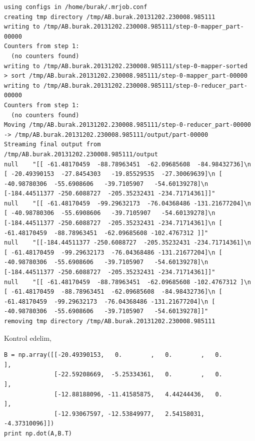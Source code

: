 \documentclass[12pt,fleqn]{article}\usepackage{../../common}
\begin{document}
\begin{verbatim}
using configs in /home/burak/.mrjob.conf
creating tmp directory /tmp/AB.burak.20131202.230008.985111
writing to /tmp/AB.burak.20131202.230008.985111/step-0-mapper_part-00000
Counters from step 1:
  (no counters found)
writing to /tmp/AB.burak.20131202.230008.985111/step-0-mapper-sorted
> sort /tmp/AB.burak.20131202.230008.985111/step-0-mapper_part-00000
writing to /tmp/AB.burak.20131202.230008.985111/step-0-reducer_part-00000
Counters from step 1:
  (no counters found)
Moving /tmp/AB.burak.20131202.230008.985111/step-0-reducer_part-00000 -> /tmp/AB.burak.20131202.230008.985111/output/part-00000
Streaming final output from /tmp/AB.burak.20131202.230008.985111/output
null	"[[ -61.48170459  -88.78963451  -62.09685608  -84.98432736]\n [ -20.49390153  -27.8454303   -19.85529535  -27.30069639]\n [ -40.98780306  -55.6908606   -39.7105907   -54.60139278]\n [-184.44511377 -250.6088727  -205.35232431 -234.71714361]]"
null	"[[ -61.48170459  -99.29632173  -76.04368486 -131.21677204]\n [ -40.98780306  -55.6908606   -39.7105907   -54.60139278]\n [-184.44511377 -250.6088727  -205.35232431 -234.71714361]\n [ -61.48170459  -88.78963451  -62.09685608 -102.4767312 ]]"
null	"[[-184.44511377 -250.6088727  -205.35232431 -234.71714361]\n [ -61.48170459  -99.29632173  -76.04368486 -131.21677204]\n [ -40.98780306  -55.6908606   -39.7105907   -54.60139278]\n [-184.44511377 -250.6088727  -205.35232431 -234.71714361]]"
null	"[[ -61.48170459  -88.78963451  -62.09685608 -102.4767312 ]\n [ -61.48170459  -88.78963451  -62.09685608  -84.98432736]\n [ -61.48170459  -99.29632173  -76.04368486 -131.21677204]\n [ -40.98780306  -55.6908606   -39.7105907   -54.60139278]]"
removing tmp directory /tmp/AB.burak.20131202.230008.985111
\end{verbatim}

Kontrol edelim,

\begin{verbatim}
B = np.array([[-20.49390153,   0.        ,   0.        ,   0.        ],
              [-22.59208669,  -5.25334361,   0.        ,   0.        ],
              [-12.88188096, -11.41585875,   4.44244436,   0.        ],
              [-12.93067597, -12.53849977,   2.54158031,  -4.37310096]])
print np.dot(A,B.T)
\end{verbatim}
\end{document}
